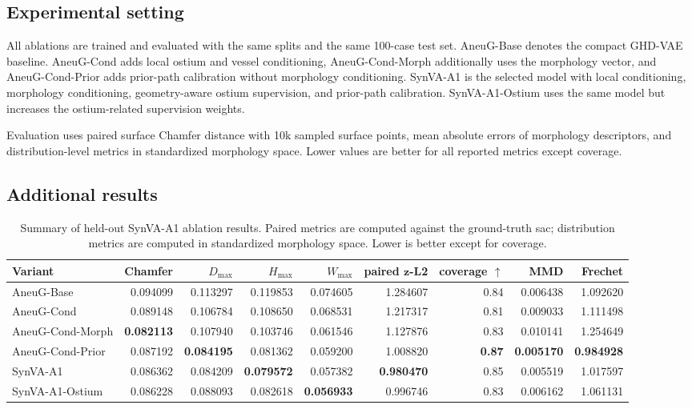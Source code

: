 \subsection{Experimental setting}

All ablations are trained and evaluated with the same splits and the same
100-case test set. AneuG-Base denotes the compact GHD-VAE baseline. AneuG-Cond
adds local ostium and vessel conditioning, AneuG-Cond-Morph additionally uses
the morphology vector, and AneuG-Cond-Prior adds prior-path calibration without
morphology conditioning. SynVA-A1 is the selected model with local
conditioning, morphology conditioning, geometry-aware ostium supervision, and
prior-path calibration. SynVA-A1-Ostium uses the same model but increases the
ostium-related supervision weights.

Evaluation uses paired surface Chamfer distance with 10k sampled surface
points, mean absolute errors of morphology descriptors, and distribution-level
metrics in standardized morphology space. Lower values are better for all
reported metrics except coverage.

\subsection{Additional results}

\begin{table}[t]
\centering
\caption{Summary of held-out SynVA-A1 ablation results. Paired metrics are computed against the ground-truth sac; distribution metrics are computed in standardized morphology space. Lower is better except for coverage.}
\label{tab:synva-a1-results-summary}
\scriptsize
\setlength{\tabcolsep}{3.0pt}
\begin{tabular}{lrrrrrrrr}
\toprule
Variant & Chamfer & $D_{\max}$ & $H_{\max}$ & $W_{\max}$ & paired $\bm{z}$-L2 & coverage $\uparrow$ & MMD & Frechet \\
\midrule
AneuG-Base & 0.094099 & 0.113297 & 0.119853 & 0.074605 & 1.284607 & 0.84 & 0.006438 & 1.092620 \\
AneuG-Cond & 0.089148 & 0.106784 & 0.108650 & 0.068531 & 1.217317 & 0.81 & 0.009033 & 1.111498 \\
AneuG-Cond-Morph & \textbf{0.082113} & 0.107940 & 0.103746 & 0.061546 & 1.127876 & 0.83 & 0.010141 & 1.254649 \\
AneuG-Cond-Prior & 0.087192 & \textbf{0.084195} & 0.081362 & 0.059200 & 1.008820 & \textbf{0.87} & \textbf{0.005170} & \textbf{0.984928} \\
SynVA-A1 & 0.086362 & 0.084209 & \textbf{0.079572} & 0.057382 & \textbf{0.980470} & 0.85 & 0.005519 & 1.017597 \\
SynVA-A1-Ostium & 0.086228 & 0.088093 & 0.082618 & \textbf{0.056933} & 0.996746 & 0.83 & 0.006162 & 1.061131 \\
\bottomrule
\end{tabular}
\end{table}

